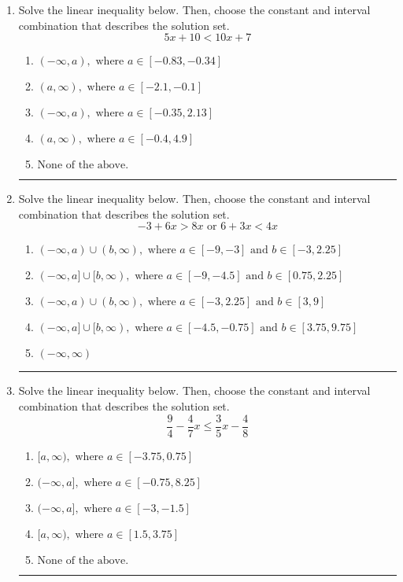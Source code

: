 \documentclass[14pt]{extbook}
\newcommand{\litem}[1]{\item#1\hspace*{-1cm}\rule{\textwidth}{0.4pt}}
\begin{document}
\begin{enumerate}
{\begin{enumerate}[label=\Alph*.]
\end{enumerate} }
\litem{
Solve the linear inequality below. Then, choose the constant and interval combination that describes the solution set.\[ 5x + 10 < 10x + 7 \]\begin{enumerate}[label=\Alph*.]
\item \( (-\infty, a), \text{ where } a \in [-0.83, -0.34] \)
\item \( (a, \infty), \text{ where } a \in [-2.1, -0.1] \)
\item \( (-\infty, a), \text{ where } a \in [-0.35, 2.13] \)
\item \( (a, \infty), \text{ where } a \in [-0.4, 4.9] \)
\item \( \text{None of the above}. \)

\end{enumerate} }
\litem{
Solve the linear inequality below. Then, choose the constant and interval combination that describes the solution set.\[ -3 + 6 x > 8 x \text{ or } 6 + 3 x < 4 x \]\begin{enumerate}[label=\Alph*.]
\item \( (-\infty, a) \cup (b, \infty), \text{ where } a \in [-9, -3] \text{ and } b \in [-3, 2.25] \)
\item \( (-\infty, a] \cup [b, \infty), \text{ where } a \in [-9, -4.5] \text{ and } b \in [0.75, 2.25] \)
\item \( (-\infty, a) \cup (b, \infty), \text{ where } a \in [-3, 2.25] \text{ and } b \in [3, 9] \)
\item \( (-\infty, a] \cup [b, \infty), \text{ where } a \in [-4.5, -0.75] \text{ and } b \in [3.75, 9.75] \)
\item \( (-\infty, \infty) \)

\end{enumerate} }
\litem{
Solve the linear inequality below. Then, choose the constant and interval combination that describes the solution set.\[ \frac{9}{4} - \frac{4}{7} x \leq \frac{3}{5} x - \frac{4}{8} \]\begin{enumerate}[label=\Alph*.]
\item \( [a, \infty), \text{ where } a \in [-3.75, 0.75] \)
\item \( (-\infty, a], \text{ where } a \in [-0.75, 8.25] \)
\item \( (-\infty, a], \text{ where } a \in [-3, -1.5] \)
\item \( [a, \infty), \text{ where } a \in [1.5, 3.75] \)
\item \( \text{None of the above}. \)


\end{enumerate}}
\end{enumerate}
\end{document}
